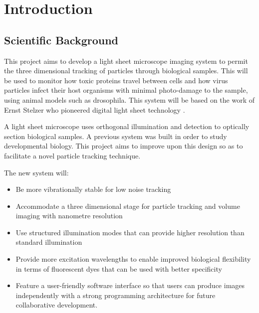 \ifpdf
    \graphicspath{{Chapters/intro/Figs/Raster/}{Chapters/intro/Figs/PDF/}{Chapters/intro/Figs/}}
\else
    \graphicspath{{Chapters/intro/Figs/Vector/}{Chapters/intro/Figs/}}
\fi

\chapter{Introduction}


\section{Scientific Background}
This project aims to develop a light sheet microscope imaging system to permit the three dimensional tracking of particles through biological samples. This will be used to monitor how toxic proteins travel between cells and how virus particles infect their host organisms with minimal %
photo-damage to the sample, using animal models such as drosophila. This system will be based on the work of Ernst Stelzer who pioneered digital light sheet technology \cite{Huisken2004}.

A light sheet microscope uses orthogonal illumination and detection to optically section biological samples.
A previous system was built in order to study developmental biology. This project aims to improve upon this design so as to facilitate a novel particle tracking technique.

The new system will:
\begin{itemize}
	\item Be more vibrationally stable for low noise tracking
	\item Accommodate a three dimensional stage for particle tracking and volume imaging with nanometre resolution
	\item Use structured illumination modes that can provide higher resolution than standard illumination
	\item Provide more excitation wavelengths to enable improved biological flexibility in terms of fluorescent dyes that can be used with better specificity
	\item Feature a user-friendly software interface so that users can produce images independently with a strong programming architecture for future collaborative development.
\end{itemize}

